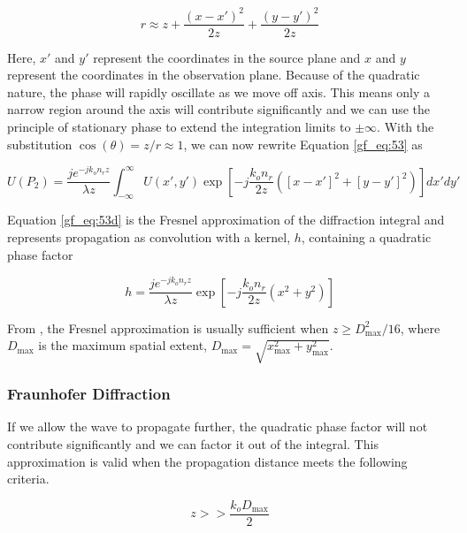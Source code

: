 \begin{equation}
r\approx z + \frac{(x-x')^2}{2z}+\frac{(y-y')^2}{2z}
\label{gf_eq:53c}
\end{equation}
\renewcommand{\baselinestretch}{2} \small\normalsize

Here, $x'$ and $y'$ represent the coordinates in the source plane and $x$ and $y$ represent the coordinates in the observation plane. Because of the quadratic nature, the phase will rapidly oscillate as we move off axis. This means only a narrow region around the axis will contribute significantly and we can use the principle of stationary phase \cite{gbur_math} to extend the integration limits to $\pm \infty$. With the substitution $\cos(\theta) = z/r \approx 1$, we can now rewrite Equation \ref{gf_eq:53} as

\begin{equation}
\boxed{U(P_2) =\frac{je^{-jk_on_rz}}{\lambda z}\int_{-\infty}^{\infty} U(x',y')\exp\left[-j \frac{k_on_r}{2z}\left([x-x']^2 + [y-y']^2 \right) \right]dx' dy'}
\label{gf_eq:53d}
\end{equation}
\renewcommand{\baselinestretch}{2} \small\normalsize

Equation \ref{gf_eq:53d} is the Fresnel approximation of the diffraction integral and represents propagation as convolution with a kernel, $h$, containing a quadratic phase factor

\begin{equation}
h = \frac{je^{-jk_on_r z}}{\lambda z}\exp\left[-j\frac{k_on_r}{2z}\left(x^2 + y^2 \right) \right]
\label{gf_eq:53e}
\end{equation}
\renewcommand{\baselinestretch}{2} \small\normalsize

From \cite{goodman_fourier}, the Fresnel approximation is usually sufficient when $z\geq D_{\text{max}}^2/16$, where $D_{\text{max}}$ is the maximum spatial extent, $D_{\text{max}} = \sqrt{x_{\text{max}}^2 + y_{\text{max}}^2}$. 

\subsubsection{Fraunhofer Diffraction}
If we allow the wave to propagate further, the quadratic phase factor will not contribute significantly and we can factor it out of the integral. This approximation is valid when the propagation distance meets the following criteria.

\begin{equation}
z >> \frac{k_oD_{\text{max}}}{2}
\label{gf_eq:53f}
\end{equation}
\renewcommand{\baselinestretch}{2} \small\normalsize

